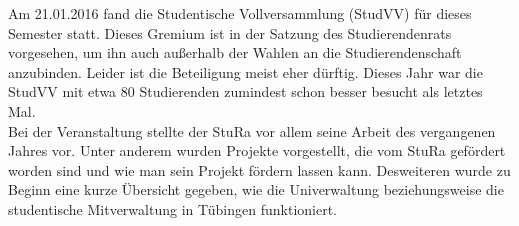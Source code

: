 Am 21.01.2016 fand die Studentische Vollversammlung (StudVV) für dieses Semester statt. Dieses Gremium ist in der Satzung des Studierendenrats vorgesehen, um ihn auch außerhalb der Wahlen an die Studierendenschaft anzubinden. Leider ist die Beteiligung meist eher dürftig. Dieses Jahr war die StudVV mit etwa 80 Studierenden zumindest schon besser besucht als letztes Mal.\\
Bei der Veranstaltung stellte der StuRa vor allem seine Arbeit des vergangenen Jahres vor. Unter anderem wurden Projekte vorgestellt, die vom StuRa gefördert worden sind und wie man sein Projekt fördern lassen kann. Desweiteren wurde zu Beginn eine kurze Übersicht gegeben, wie die Univerwaltung beziehungsweise die studentische Mitverwaltung in Tübingen funktioniert.
